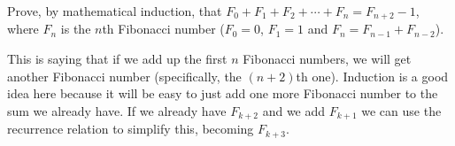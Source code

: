 \documentclass[11pt]{exam}
\begin{document}
\begin{questions}
%
%
%
%
%
\question[8] Prove, by mathematical induction, that $F_0 + F_1 + F_2 + \cdots + F_{n} = F_{n+2} - 1$, where $F_n$ is the $n$th Fibonacci number ($F_0 = 0$, $F_1 = 1$ and $F_n = F_{n-1} + F_{n-2}$).
\begin{solution}
This is saying that if we add up the first $n$ Fibonacci numbers, we will get another Fibonacci number (specifically, the $(n+2)$th one).  Induction is a good idea here because it will be easy to just add one more Fibonacci number to the sum we already have.  If we already have $F_{k+2}$ and we add $F_{k+1}$ we can use the recurrence relation to simplify this, becoming $F_{k+3}$.  
 

\end{solution}
\end{questions}
\end{document}
